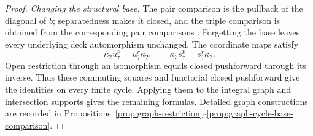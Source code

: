 \documentclass[11pt]{article}
\theoremstyle{definition}
\theoremstyle{remark}
\begin{document}
\begin{proof}
\emph{Changing the structural base.}
The pair comparison is the pullback of the diagonal of \(b\);
separatedness makes it closed, and the triple comparison is obtained
from the corresponding pair comparisons
\cite{StacksRelativeProductClosedImmersion}.
Forgetting the base leaves every underlying deck automorphism
unchanged. The coordinate maps satisfy
\[
 \kappa_2u_\tau^p=u_{\bar\tau}^r\kappa_2,\qquad
 \kappa_3s_\tau^p=s_{\bar\tau}^r\kappa_2.
\]
Open restriction through an isomorphism equals closed pushforward
through its inverse. Thus these commuting squares and functorial
closed pushforward give the identities on every finite cycle.
Applying them to the integral graph and intersection supports gives
the remaining formulas. Detailed graph constructions are recorded in
Propositions~\ref{prop:graph-restriction}--\ref{prop:graph-cycle-base-comparison}.
\end{proof}
\end{document}
